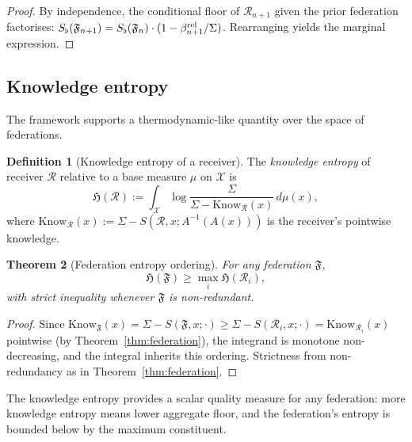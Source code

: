 \documentclass[11pt,twocolumn,a4paper]{article}
\newtheorem{theorem}{Theorem}[section]
\theoremstyle{definition}
\newtheorem{definition}[theorem]{Definition}
\theoremstyle{remark}
\newcommand{\Cands}{\mathcal{X}}
\newcommand{\Federation}{\mathfrak{F}}
\newcommand{\receiver}{\mathcal{R}}
\newcommand{\Sigmax}{\Sigma}
\newcommand{\Sscalar}{S}
\newcommand{\Sfloor}{S_{\flat}}
\newcommand{\Know}{\mathrm{Know}}
\newcommand{\Hknow}{\mathfrak{H}}
\begin{document}
\begin{proof}
By independence, the conditional floor of $\receiver_{n+1}$ given the prior federation factorises: $\Sfloor(\Federation_{n+1}) = \Sfloor(\Federation_n) \cdot (1 - \beta_{n+1}^{\rm rel}/\Sigmax)$. Rearranging yields the marginal expression.
\end{proof}

\subsection{Knowledge entropy}

The framework supports a thermodynamic-like quantity over the space of federations.

\begin{definition}[Knowledge entropy of a receiver]
\label{def:H-receiver}
The \emph{knowledge entropy} of receiver $\receiver$ relative to a base measure $\mu$ on $\Cands$ is
\[
\Hknow(\receiver) := \int_{\Cands} \log\frac{\Sigmax}{\Sigmax - \Know_{\receiver}(x)} \, d\mu(x),
\]
where $\Know_{\receiver}(x) := \Sigmax - \Sscalar(\receiver, x; A^{-1}(A(x)))$ is the receiver's pointwise knowledge.
\end{definition}

\begin{theorem}[Federation entropy ordering]
\label{thm:H-fed}
For any federation $\Federation$,
\[
\Hknow(\Federation) \geq \max_i \Hknow(\receiver_i),
\]
with strict inequality whenever $\Federation$ is non-redundant.
\end{theorem}

\begin{proof}
Since $\Know_{\Federation}(x) = \Sigmax - \Sscalar(\Federation, x; \cdot) \geq \Sigmax - \Sscalar(\receiver_i, x; \cdot) = \Know_{\receiver_i}(x)$ pointwise (by Theorem~\ref{thm:federation}), the integrand is monotone non-decreasing, and the integral inherits this ordering. Strictness from non-redundancy as in Theorem~\ref{thm:federation}.
\end{proof}

The knowledge entropy provides a scalar quality measure for any federation: more knowledge entropy means lower aggregate floor, and the federation's entropy is bounded below by the maximum constituent.
\end{document}
